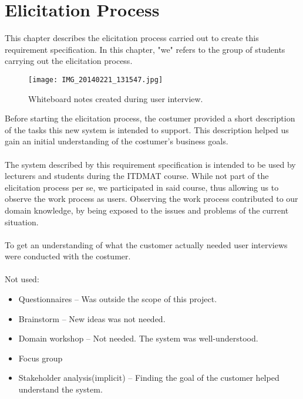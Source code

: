 \documentclass[Main]{subfiles}
\begin{document}
\chapter{Elicitation Process}\label{cha:Elicitation}

This chapter describes the elicitation process carried out to create this requirement specification. 
In this chapter, "we" refers to the group of students carrying out the elicitation process.
\\

\begin{wrapfigure}{r}{0.6\textwidth}
\vspace{-20pt}
\begin{center}
\texttt{[image: IMG\_20140221\_131547.jpg]}
\vspace{-5pt}
\end{center}
\vspace{-10pt}
\caption{Whiteboard notes created during user interview.}
\label{fig:UserInterviewNotes}
\vspace{-10pt}
\end{wrapfigure}

Before starting the elicitation process, the costumer provided a short description of the tasks this new system is intended to support. 
This description helped us gain an initial understanding of the costumer's business goals.
\\
\\
The system described by this requirement specification is intended to be used by lecturers and students during the ITDMAT course. 
While not part of the elicitation process per se, we participated in said course, thus allowing us to observe the work process as users. 
Observing the work process contributed to our domain knowledge, by being exposed to the issues and problems of the current situation.
\\
\\
To get an understanding of what the customer actually needed user interviews were conducted with the costumer. 
\\
\\
Not used:
\begin{itemize}
\item Questionnaires -- Was outside the scope of this project.
\item Brainstorm -- New ideas was not needed.
\item Domain workshop -- Not needed. The system was well-understood.
\item Focus group
\item Stakeholder analysis(implicit) -- Finding the goal of the customer helped understand the system.
\end{itemize}
\end{document}
